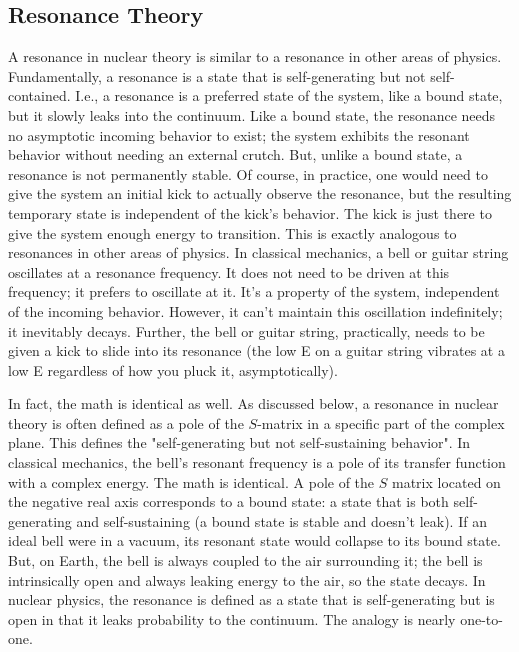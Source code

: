 \subsection{Resonance Theory}
A resonance in nuclear theory is similar to a resonance in other areas of physics. Fundamentally, a resonance is a state that is self-generating but not self-contained. I.e., a resonance is a preferred state of the system, like a bound state, but it slowly leaks into the continuum. Like a bound state, the resonance needs no asymptotic incoming behavior to exist; the system exhibits the resonant behavior without needing an external crutch. But, unlike a bound state, a resonance is not permanently stable. Of course, in practice, one would need to give the system an initial kick to actually observe the resonance, but the resulting temporary state is independent of the kick's behavior. The kick is just there to give the system enough energy to transition. This is exactly analogous to resonances in other areas of physics. In classical mechanics, a bell or guitar string oscillates at a resonance frequency. It does not need to be driven at this frequency; it prefers to oscillate at it. It's a property of the system, independent of the incoming behavior. However, it can't maintain this oscillation indefinitely; it inevitably decays. Further, the bell or guitar string, practically, needs to be given a kick to slide into its resonance (the low E on a guitar string vibrates at a low E regardless of how you pluck it, asymptotically).

In fact, the math is identical as well. As discussed below, a resonance in nuclear theory is often defined as a pole of the $S$-matrix in a specific part of the complex plane. This defines the "self-generating but not self-sustaining behavior". In classical mechanics, the bell's resonant frequency is a pole of its transfer function with a complex energy. The math is identical. A pole of the $S$ matrix located on the negative real axis corresponds to a bound state: a state that is both self-generating and self-sustaining (a bound state is stable and doesn't leak). If an ideal bell were in a vacuum, its resonant state would collapse to its bound state. But, on Earth, the bell is always coupled to the air surrounding it; the bell is intrinsically open and always leaking energy to the air, so the state decays. In nuclear physics, the resonance is defined as a state that is self-generating but is open in that it leaks probability to the continuum. The analogy is nearly one-to-one.

